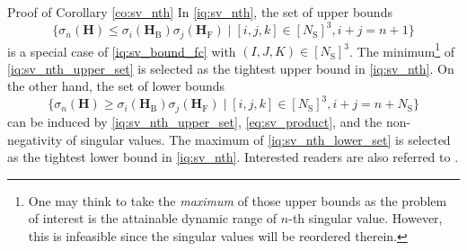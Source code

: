 \begin{appendix}
\begin{subsection}{Proof of Corollary \ref{co:sv_nth}}\label{ap:sv_nth}
	In \eqref{iq:sv_nth}, the set of upper bounds
	\begin{equation}
		\bigl\{\sigma_n(\mathbf{H}) \le \sigma_i(\mathbf{H}_\mathrm{B}) \sigma_j(\mathbf{H}_\mathrm{F}) \mid [i,j,k] \in [N_\mathrm{S}]^3, i+j=n+1\bigr\}
		\label{iq:sv_nth_upper_set}
	\end{equation}
	is a special case of \eqref{iq:sv_bound_fc} with $(I, J, K) \in [N_\mathrm{S}]^3$.
	The minimum\footnote{One may think to take the \emph{maximum} of those upper bounds as the problem of interest is the attainable dynamic range of $n$-th singular value. However, this is infeasible since the singular values will be reordered therein.} of \eqref{iq:sv_nth_upper_set} is selected as the tightest upper bound in \eqref{iq:sv_nth}.
	On the other hand, the set of lower bounds
	\begin{equation}
		\bigl\{\sigma_n(\mathbf{H}) \ge \sigma_i(\mathbf{H}_\mathrm{B}) \sigma_j(\mathbf{H}_\mathrm{F}) \mid [i,j,k] \in [N_\mathrm{S}]^3, i+j=n+N_\mathrm{S}\bigr\}
		\label{iq:sv_nth_lower_set}
	\end{equation}
	can be induced by \eqref{iq:sv_nth_upper_set}, \eqref{eq:sv_product}, and the non-negativity of singular values.
	The maximum of \eqref{iq:sv_nth_lower_set} is selected as the tightest lower bound in \eqref{iq:sv_nth}.
	Interested readers are also referred to \cite[(2.0.3)]{Zhang2005}.


\end{subsection}
\end{appendix}
